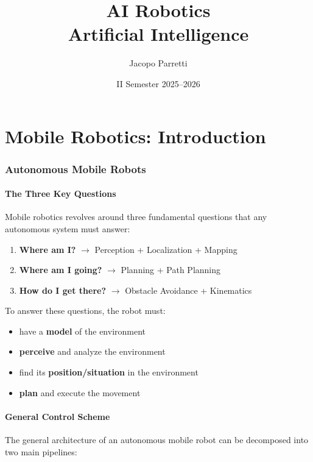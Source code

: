 \documentclass[11pt,a4paper]{article}
\title{\textbf{AI Robotics}\\
\large Artificial Intelligence}
\author{Jacopo Parretti}
\date{II Semester 2025--2026}
\theoremstyle{definition}
\theoremstyle{plain}
\theoremstyle{remark}
\begin{document}
\maketitle
\tableofcontents
\newpage


\part{Mobile Robotics: Introduction}

\section{Autonomous Mobile Robots}

\subsection{The Three Key Questions}

Mobile robotics revolves around three fundamental questions that any autonomous system must answer:

\begin{enumerate}
    \item \textbf{Where am I?} $\to$ Perception + Localization + Mapping
    \item \textbf{Where am I going?} $\to$ Planning + Path Planning
    \item \textbf{How do I get there?} $\to$ Obstacle Avoidance + Kinematics
\end{enumerate}

To answer these questions, the robot must:
\begin{itemize}
    \item have a \textbf{model} of the environment
    \item \textbf{perceive} and analyze the environment
    \item find its \textbf{position/situation} in the environment
    \item \textbf{plan} and execute the movement
\end{itemize}

\subsection{General Control Scheme}

The general architecture of an autonomous mobile robot can be decomposed into two main pipelines:
\end{document}
